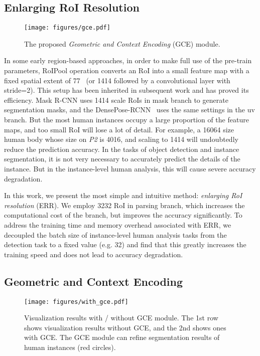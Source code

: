 \documentclass[10pt,twocolumn,letterpaper]{article}
\begin{document}
\subsection{Enlarging RoI Resolution}

\begin{figure}[t]
\begin{center}
\texttt{[image: figures/gce.pdf]}
\end{center}
\caption{The proposed  \emph{Geometric and Context Encoding} (GCE) module.}
\label{fig:gce_module}
\end{figure}


In some early region-based approaches, in order to make full use of the pre-train parameters, RoIPool operation converts an RoI into a small feature map with a fixed spatial extent of 77~\cite{Girshick_iccv2015_fast-rcnn, Lin_cvpr2017_fpn, He_iccv2017_maskrcnn} (or 1414 followed by a convolutional layer with stride=2). This setup has been inherited in subsequent work and has proved its efficiency. Mask R-CNN uses 1414 scale RoIs in mask branch to generate segmentation masks, and the DensePose-RCNN~\cite{Guler_cvpr2018_densepose} uses the same settings in the uv branch. But the most human instances occupy a large proportion of the feature maps, and too small RoI will lose a lot of detail. For example, a 16064 size human body whose size on \emph{P2} is 4016, and scaling to 1414 will undoubtedly reduce the prediction accuracy. In the tasks of object detection and instance segmentation, it is not very necessary to accurately predict the details of the instance. But in the instance-level human analysis, this will cause severe accuracy degradation.

In this work, we present the most simple and intuitive method: \emph{enlarging RoI resolution} (ERR). We employ 3232 RoI in parsing branch, which increases the computational cost of the branch, but improves the accuracy significantly. To address the training time and memory overhead associated with ERR, we decoupled the batch size of instance-level human analysis tasks from the detection task to a fixed value (e.g. 32) and find that this greatly increases the training speed and does not lead to accuracy degradation.

\subsection{Geometric and Context Encoding}

\begin{figure}[t]
\begin{center}
\texttt{[image: figures/with\_gce.pdf]}
\end{center}
\caption{Visualization results with / without GCE module. The 1st row shows visualization results without GCE, and the 2nd shows ones with GCE. The GCE module can refine segmentation results of human instances (red circles).}
\label{fig:with_gce}
\end{figure}
\end{document}
